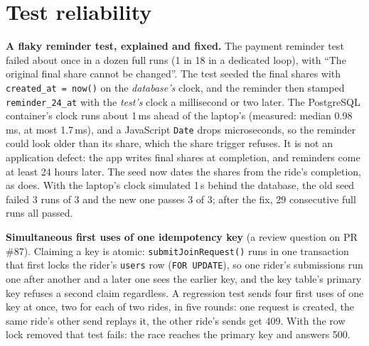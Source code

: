 \documentclass[10pt]{article}
\begin{document}
\section{Test reliability}\label{sec:reliability}
\textbf{A flaky reminder test, explained and fixed.} The payment reminder test failed about once
in a dozen full runs (1 in 18 in a dedicated loop), with ``The original final share cannot be
changed''. The test seeded the final shares with \texttt{created\_at = now()} on the
\emph{database's} clock, and the reminder then stamped \texttt{reminder\_24\_at} with the
\emph{test's} clock a millisecond or two later. The PostgreSQL container's clock runs about 1\,ms
ahead of the laptop's (measured: median 0.98\,ms, at most 1.7\,ms), and a JavaScript
\texttt{Date} drops microseconds, so the reminder could look older than its share, which the
share trigger refuses. It is not an application defect: the app writes final shares at
completion, and reminders come at least 24 hours later. The seed now dates the shares from the
ride's completion, as  does. With the laptop's clock simulated 1\,s behind
the database, the old seed failed 3 runs of 3 and the new one passes 3 of 3; after the fix, 29
consecutive full runs all passed.

\textbf{Simultaneous first uses of one idempotency key} (a review question on PR \#87). Claiming
a key is atomic: \texttt{submitJoinRequest()} runs in one transaction that first locks the rider's
\texttt{users} row (\texttt{FOR UPDATE}), so one rider's submissions run one after another and a
later one sees the earlier key, and the key table's primary key refuses a second claim regardless.
A regression test sends four first uses of one key at once, two for each of two rides, in five
rounds: one request is created, the same ride's other send replays it, the other ride's sends get
409. With the row lock removed that test fails: the race reaches the primary key and answers 500.
\end{document}
